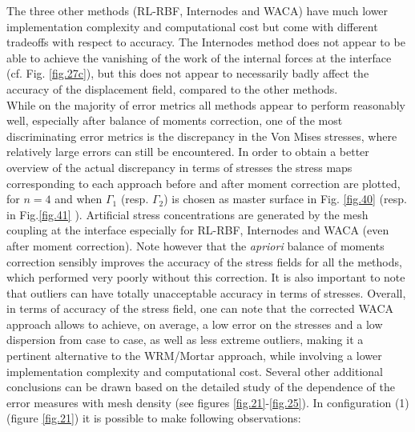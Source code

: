  The three other methods (RL-RBF, Internodes and WACA) have much lower implementation complexity and computational cost but come with different tradeoffs with respect to accuracy. The Internodes method does not appear to be able to achieve the vanishing of the work of the internal forces at the interface (cf. Fig. \ref{fig.27c}), but this does not appear to necessarily badly affect the accuracy of the displacement field, compared to the other methods.
 \\
 While on the majority of error metrics all methods appear to perform reasonably well, especially after balance of moments correction, one of the most discriminating error metrics is the discrepancy in the Von Mises stresses, where relatively large errors can still be encountered. In order to obtain a better overview of the actual discrepancy in terms of stresses the stress maps corresponding to each approach before and after moment correction are plotted, for $n=4$ and when $\Gamma_1$ (resp. $\Gamma_2$) is chosen as master surface in Fig. \ref{fig.40} (resp. in Fig.\ref{fig.41} ). Artificial stress concentrations are generated by the mesh coupling at the interface especially for RL-RBF, Internodes and WACA (even after moment correction). Note however that the \textit{apriori} balance of moments correction sensibly improves the accuracy of the stress fields for all the methods, which performed very poorly without this correction. It is also important to note that outliers can have totally unacceptable accuracy in terms of stresses. Overall, in terms of accuracy of the stress field, one can note that the corrected WACA approach allows to achieve, on average, a low error on the stresses and a low dispersion from case to case, as well as less extreme outliers, making it a pertinent alternative to the WRM/Mortar approach, while involving a lower implementation complexity and computational cost. Several other additional conclusions can be drawn based on the detailed study of the dependence of the error measures with mesh density (see figures \ref{fig.21}-\ref{fig.25}). In configuration (1)(figure \ref{fig.21}) it is possible to make following observations:
